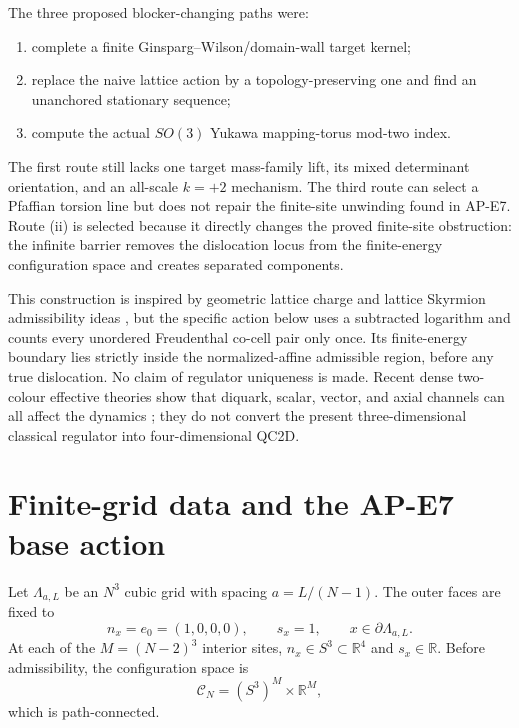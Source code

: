 \documentclass[11pt]{article}
\numberwithin{equation}{section}
\theoremstyle{definition}
\theoremstyle{remark}
\newcommand{\RR}{\mathbb R}
\newcommand{\cC}{\mathcal C}
\begin{document}
The three proposed blocker-changing paths were:
\begin{enumerate}[label=(\roman*)]
\item complete a finite Ginsparg--Wilson/domain-wall target kernel;
\item replace the naive lattice action by a topology-preserving one and find
an unanchored stationary sequence;
\item compute the actual \(SO(3)\) Yukawa mapping-torus mod-two index.
\end{enumerate}
The first route still lacks one target mass-family lift, its mixed determinant
orientation, and an all-scale \(k=+2\) mechanism.  The third route can select a
Pfaffian torsion line but does not repair the finite-site unwinding found in
AP-E7.  Route (ii) is selected because it directly changes the proved
finite-site obstruction: the infinite barrier removes the dislocation locus
from the finite-energy configuration space and creates separated components.

This construction is inspired by geometric lattice charge and lattice
Skyrmion admissibility ideas \cite{BergLuscher1981APE8,
Berg1981DislocationsAPE8,Ward1995APE8,SchrammSvetitsky2000APE8}, but the
specific action below uses a subtracted logarithm and counts every unordered
Freudenthal co-cell pair only once.  Its finite-energy boundary lies strictly
inside the normalized-affine admissible region, before any true dislocation.
No claim of regulator uniqueness is
made.  Recent dense two-colour effective theories show that diquark, scalar,
vector, and axial channels can all affect the dynamics
\cite{SuenagaEtAl2023APE8,SuenagaEtAl2024APE8}; they do not convert the present
three-dimensional classical regulator into four-dimensional QC2D.

\section{Finite-grid data and the AP-E7 base action}

Let \(\Lambda_{a,L}\) be an \(N^3\) cubic grid with spacing
\(a=L/(N-1)\).  The outer faces are fixed to
\begin{equation}
 n_x=e_0=(1,0,0,0),\qquad s_x=1,
 \qquad x\in\partial\Lambda_{a,L}.
 \label{eq:boundary}
\end{equation}
At each of the \(M=(N-2)^3\) interior sites,
\(n_x\in S^3\subset\RR^4\) and \(s_x\in\RR\).  Before admissibility, the
configuration space is
\begin{equation}
 \cC_N=(S^3)^M\times\RR^M,
 \label{eq:naive-space}
\end{equation}
which is path-connected.
\end{document}
